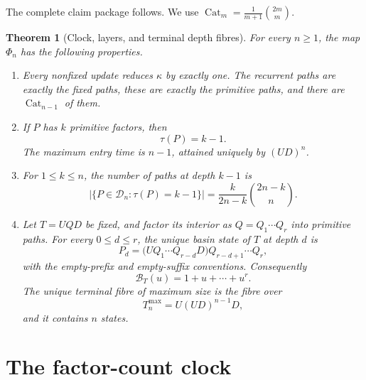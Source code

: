 \documentclass[10pt,a4paper]{amsart}
\newtheorem{theorem}{Theorem}[section]
\theoremstyle{definition}
\theoremstyle{remark}
\newcommand{\Dyck}{\mathcal D}
\newcommand{\PhiMap}{\Phi}
\newcommand{\Cat}{\operatorname{Cat}}
\newcommand{\fac}{\kappa}
\newcommand{\Fib}{\mathcal B}
\begin{document}
The complete claim package follows.  We use
$\Cat_m=\frac{1}{m+1}\binom{2m}{m}$.

\begin{theorem}[Clock, layers, and terminal depth fibres]\label{thm:main}
For every $n\geq1$, the map $\PhiMap_n$ has the following properties.
\begin{enumerate}[label=\textup{(\roman*)}]
\item Every nonfixed update reduces $\fac$ by exactly one.  The recurrent
paths are exactly the fixed paths, these are exactly the primitive paths, and
there are $\Cat_{n-1}$ of them.
\item If $P$ has $k$ primitive factors, then
\begin{equation}\label{eq:pointwise-clock}
                             \tau(P)=k-1.
\end{equation}
The maximum entry time is $n-1$, attained uniquely by $(UD)^n$.
\item For $1\leq k\leq n$, the number of paths at depth $k-1$ is
\begin{equation}\label{eq:ballot-layer}
 \bigl|\{P\in\Dyck_n:\tau(P)=k-1\}\bigr|
       =\frac{k}{2n-k}\binom{2n-k}{n}.
\end{equation}
\item Let $T=UQD$ be fixed, and factor its interior as
$Q=Q_1\cdots Q_r$ into primitive paths.  For every $0\leq d\leq r$, the
unique basin state of $T$ at depth $d$ is
\begin{equation}\label{eq:source-formula}
 P_d=\bigl(UQ_1\cdots Q_{r-d}D\bigr)
             Q_{r-d+1}\cdots Q_r,
\end{equation}
with the empty-prefix and empty-suffix conventions.  Consequently
\begin{equation}\label{eq:terminal-polynomial}
                              \Fib_T(u)=1+u+\cdots+u^r.
\end{equation}
The unique terminal fibre of maximum size is the fibre over
\begin{equation}\label{eq:largest-target}
                         T_n^{\max}=U(UD)^{n-1}D,
\end{equation}
and it contains $n$ states.
\end{enumerate}
\end{theorem}

\section{The factor-count clock}\label{sec:clock}
\end{document}
